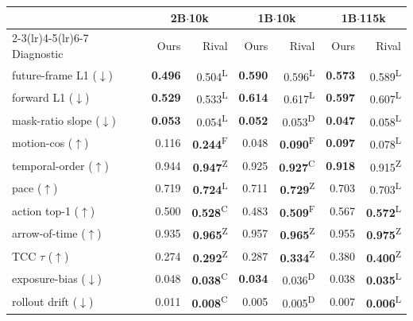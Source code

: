 \begin{table}[t]
\centering
\small
\setlength{\tabcolsep}{2pt}
\begin{tabular}{lrrrrrr}
\toprule
 & \multicolumn{2}{c}{2B$\cdot$10k} & \multicolumn{2}{c}{1B$\cdot$10k} & \multicolumn{2}{c}{1B$\cdot$115k} \\
\cmidrule(lr){2-3}\cmidrule(lr){4-5}\cmidrule(lr){6-7}
Diagnostic & Ours & Rival & Ours & Rival & Ours & Rival \\
\midrule
future-frame L1 ($\downarrow$) & \textbf{0.496} & 0.504\textsuperscript{L} & \textbf{0.590} & 0.596\textsuperscript{L} & \textbf{0.573} & 0.589\textsuperscript{L} \\
forward L1 ($\downarrow$) & \textbf{0.529} & 0.533\textsuperscript{L} & \textbf{0.614} & 0.617\textsuperscript{L} & \textbf{0.597} & 0.607\textsuperscript{L} \\
mask-ratio slope ($\downarrow$) & \textbf{0.053} & 0.054\textsuperscript{L} & \textbf{0.052} & 0.053\textsuperscript{D} & \textbf{0.047} & 0.058\textsuperscript{L} \\
motion-cos ($\uparrow$) & 0.116 & \textbf{0.244}\textsuperscript{F} & 0.048 & \textbf{0.090}\textsuperscript{F} & \textbf{0.097} & 0.078\textsuperscript{L} \\
\midrule
temporal-order ($\uparrow$) & 0.944 & \textbf{0.947}\textsuperscript{Z} & 0.925 & \textbf{0.927}\textsuperscript{C} & \textbf{0.918} & 0.915\textsuperscript{Z} \\
pace ($\uparrow$) & 0.719 & \textbf{0.724}\textsuperscript{L} & 0.711 & \textbf{0.729}\textsuperscript{Z} & 0.703 & 0.703\textsuperscript{L} \\
action top-1 ($\uparrow$) & 0.500 & \textbf{0.528}\textsuperscript{C} & 0.483 & \textbf{0.509}\textsuperscript{F} & 0.567 & \textbf{0.572}\textsuperscript{L} \\
arrow-of-time ($\uparrow$) & 0.935 & \textbf{0.965}\textsuperscript{Z} & 0.957 & \textbf{0.965}\textsuperscript{Z} & 0.955 & \textbf{0.975}\textsuperscript{Z} \\
TCC $\tau$ ($\uparrow$) & 0.274 & \textbf{0.292}\textsuperscript{Z} & 0.287 & \textbf{0.334}\textsuperscript{Z} & 0.380 & \textbf{0.400}\textsuperscript{Z} \\
exposure-bias ($\downarrow$) & 0.048 & \textbf{0.038}\textsuperscript{C} & \textbf{0.034} & 0.036\textsuperscript{D} & 0.038 & \textbf{0.035}\textsuperscript{L} \\
rollout drift ($\downarrow$) & 0.011 & \textbf{0.008}\textsuperscript{C} & 0.005 & 0.005\textsuperscript{D} & 0.007 & \textbf{0.006}\textsuperscript{L} \\

\end{tabular}
\end{table}
